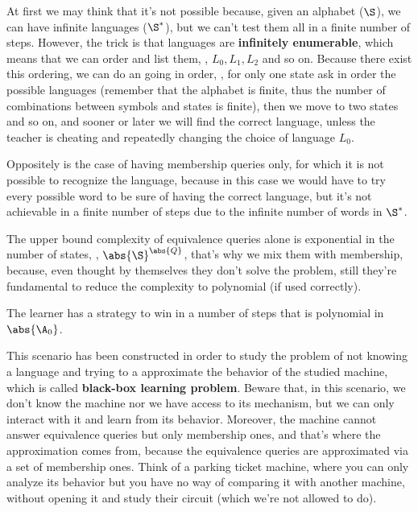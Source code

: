 \documentclass[oneside]{academica}
\begin{document}
\begin{question*}
  At first we may think that it's not possible because, given an alphabet ($\S$), we can have infinite languages ($\S^*$), but we can't test them all in a finite number of steps.
  However, the trick is that languages are \textbf{infinitely enumerable}, which means that we can order and list them, \ie, $L_0, L_1, L_2$ and so on.
  Because there exist this ordering, we can do an  going in order, \ie, for only one state ask in order the possible languages (remember that the alphabet is finite, thus the number of combinations between symbols and states is finite), then we move to two states and so on, and sooner or later we will find the correct language, unless the teacher is cheating and repeatedly changing the choice of language $L_0$.

  \bigskip
  Oppositely is the case of having membership queries only, for which it is not possible to recognize the language, because in this case we would have to try every possible word to be sure of having the correct language, but it's not achievable in a finite number of steps due to the infinite number of words in $\S^*$.

  \bigskip
  The upper bound complexity of equivalence queries alone is exponential in the number of states, \ie, $\abs{\S}^{\abs{Q}}$, that's why we mix them with membership, because, even thought by themselves they don't solve the problem, still they're fundamental to reduce the complexity to polynomial (if used correctly).
\end{question*}

\begin{theorem*}
  The learner has a strategy to win in a number of steps that is polynomial in $\abs{\A_0}$.
\end{theorem*}

This scenario has been constructed in order to study the problem of not knowing a language and trying to a approximate the behavior of the studied machine, which is called \textbf{black-box learning problem}.
Beware that, in this scenario, we don't know the machine nor we have access to its mechanism, but we can only interact with it and learn from its behavior.
Moreover, the machine cannot answer equivalence queries but only membership ones, and that's where the approximation comes from, because the equivalence queries are approximated via a set of membership ones.
Think of a parking ticket machine, where you can only analyze its behavior but you have no way of comparing it with another machine, without opening it and study their circuit (which we're not allowed to do).
\end{document}
